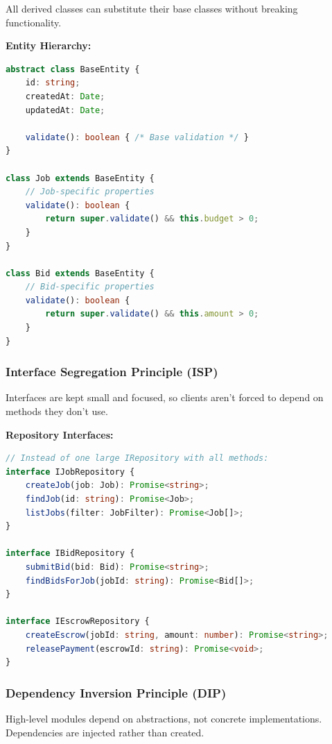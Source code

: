 \documentclass[a4paper,13pt,twoside]{report}
\theoremstyle{definition}
\begin{document}
All derived classes can substitute their base classes without breaking functionality.

\textbf{Entity Hierarchy:}
\begin{lstlisting}[language=TypeScript, caption=Entity Base Class]
abstract class BaseEntity {
    id: string;
    createdAt: Date;
    updatedAt: Date;

    validate(): boolean { /* Base validation */ }
}

class Job extends BaseEntity {
    // Job-specific properties
    validate(): boolean {
        return super.validate() && this.budget > 0;
    }
}

class Bid extends BaseEntity {
    // Bid-specific properties
    validate(): boolean {
        return super.validate() && this.amount > 0;
    }
}
\end{lstlisting}

\subsubsection{Interface Segregation Principle (ISP)}

Interfaces are kept small and focused, so clients aren't forced to depend on methods they don't use.

\textbf{Repository Interfaces:}
\begin{lstlisting}[language=TypeScript, caption=Segregated Repository Interfaces]
// Instead of one large IRepository with all methods:
interface IJobRepository {
    createJob(job: Job): Promise<string>;
    findJob(id: string): Promise<Job>;
    listJobs(filter: JobFilter): Promise<Job[]>;
}

interface IBidRepository {
    submitBid(bid: Bid): Promise<string>;
    findBidsForJob(jobId: string): Promise<Bid[]>;
}

interface IEscrowRepository {
    createEscrow(jobId: string, amount: number): Promise<string>;
    releasePayment(escrowId: string): Promise<void>;
}
\end{lstlisting}

\subsubsection{Dependency Inversion Principle (DIP)}

High-level modules depend on abstractions, not concrete implementations. Dependencies are injected rather than created.
\end{document}
